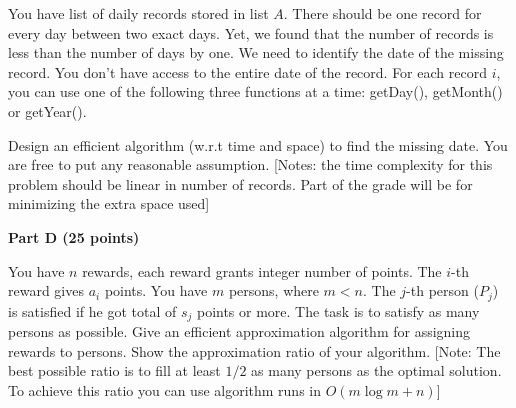 \documentclass{article}
\begin{document}
 You have list of daily records stored in
list $A$. There should be one record for every day between two exact
days. Yet, we found that the number of records is less than the number
of days by one. We need to identify the date of the missing
record. You don't have access to the entire date of the record. For
each record $i$, you can use one of the following three functions at a
time: getDay(), getMonth() or getYear().

Design an efficient algorithm (w.r.t time and space) to find the missing date. You are free to put any reasonable assumption. [Notes: the time complexity for this problem should be linear in number of records. Part of the grade will be for minimizing the extra space used]


\begin{center}
{\bf Part D (25 points)}
\end{center}

 You have $n$ rewards, each reward grants
integer number of points. The $i$-th reward gives $a_i$ points. You
have $m$ persons, where $m < n$. The $j$-th person ($P_j$) is
satisfied if he got total of $s_j$ points or more. The task is to
satisfy as many persons as possible. Give an efficient approximation
algorithm for assigning rewards to persons. Show the approximation ratio of your algorithm. 
[Note: The best possible ratio is to fill at least $1/2$ as many persons as the
optimal solution. To achieve this ratio you can use algorithm runs in $O(m\log m+n)$]
\end{document}
